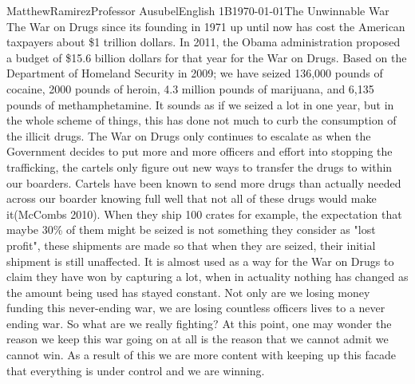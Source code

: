 \documentclass[12pt,letterpaper]{article}
\begin{document}
\begin{mla}{Matthew}{Ramirez}{Professor Ausubel}{English 1B}{\today}{The Unwinnable War}
The War on Drugs since its founding in 1971 up until now has cost the American taxpayers about \$1 trillion dollars. In 2011, the Obama administration proposed a budget of \$15.6 billion dollars for that year for the War on Drugs. Based on the Department of Homeland Security in 2009; we have seized 136,000 pounds of cocaine, 2000 pounds of heroin, 4.3 million pounds of marijuana, and 6,135 pounds of methamphetamine. It sounds as if we seized a lot in one year, but in the whole scheme of things, this has done not much to curb the consumption of the illicit drugs. The War on Drugs only continues to escalate as when the Government decides to put more and more officers and effort into stopping the trafficking, the cartels only figure out new ways to transfer the drugs to within our boarders. Cartels have been known to send more drugs than actually needed across our boarder knowing full well that not all of these drugs would make it(McCombs 2010). When they ship 100 crates for example, the expectation that maybe 30\% of them might be seized is not something they consider as "lost profit", these shipments are made so that when they are seized, their initial shipment is still unaffected. It is almost used as a way for the War on Drugs to claim they have won by capturing a lot, when in actuality nothing has changed as the amount being used has stayed constant. Not only are we losing money funding this never-ending war, we are losing countless officers lives to a never ending war. So what are we really fighting? At this point, one may wonder the reason we keep this war going on at all is the reason that we cannot admit we cannot win. As a result of this we are more content with keeping up this facade that everything is under control and we are winning.\\
\label{What should we do? Pt.2 Jail/Crime Sentencing}

\end{mla}
\end{document}
